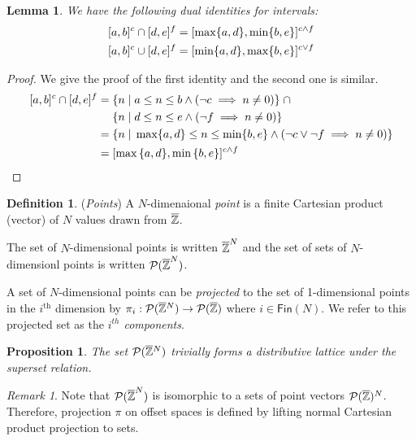 \documentclass[acmlarge,review]{acmart}
\theoremstyle{definition}
\newtheorem{defn}{Definition}
\theoremstyle{plain}
\newtheorem{lem}{Lemma}
\newtheorem{prop}{Proposition}
\theoremstyle{remark}
\newtheorem{remark}{Remark}
\begin{document}
\begin{lem}{}\label{lem:zinf-identities}
  We have the following dual identities for \zinf{} intervals:
%
  \begin{align*}
    \textnormal{$\lbrack a,b\rbrack^{c}$} \cap \textnormal{$\lbrack d,e\rbrack^{f}$} & =
      \textnormal{$\lbrack\max \{a,d\},\min \{b,e\}\rbrack^{c \wedge f}$} \\
    \textnormal{$\lbrack a,b\rbrack^{c}$} \cup \textnormal{$\lbrack d,e\rbrack^{f}$} & =
      \textnormal{$\lbrack\min \{a,d\},\max \{b,e\}\rbrack^{c \vee f}$}
  \end{align*}
\end{lem}
%
\begin{proof}
  We give the proof of the first identity and the second one is similar.
  \begin{align*}
    \textnormal{$\lbrack a,b\rbrack^{c}$} \cap \textnormal{$\lbrack d,e\rbrack^{f}$} = &
      \; \{ n \;|\; a \leq n \leq b \wedge (\neg c \implies n \neq 0) \}
      \;\cap \\
      & \; \{ n \;|\; d \leq n \leq e \wedge (\neg f \implies n \neq 0) \}
      \\
    = & \; \{ n \;|\; \max \{a,d\} \leq n \leq \min \{b,e\} \wedge (\neg c
      \vee \neg f \implies n \neq 0) \} \\
    = & \; \textnormal{$\lbrack\max{\{a,d\}},\min{\{b,e\}}\rbrack^{c \wedge f}$}
  \end{align*}
\end{proof}

\begin{defn}{(\emph{Points})}
  A $N$-dimenaional \emph{point} is a finite Cartesian product
  (vector) of $N$ values drawn from $\textnormal{$\overline{\mathbb{Z}}$}$.

  The set of $N$-dimensional points is written $\textnormal{$\overline{\mathbb{Z}}$}^N$ and the set
  of sets of $N$-dimensionl points is written $\mathcal{P}(\textnormal{$\overline{\mathbb{Z}}$}^N)$.

A set of $N$-dimensional points can be \emph{projected} to the set of
1-dimensional points in the $i^{\text{th}}$ dimension by
$\pi_i : \mathcal{P}(\textnormal{$\overline{\mathbb{Z}}$}{}^{\mkern0mu{N}}) \to
\mathcal{P}(\textnormal{$\overline{\mathbb{Z}}$}{})$
where $i \in \mathsf{Fin}(N)$. We refer to this projected set as the
\emph{$i^{th}$ components}.
\end{defn}

\begin{prop}
The set $\mathcal{P}{(\textnormal{$\overline{\mathbb{Z}}$}{}^{{N}})}$ trivially forms a
  distributive lattice under the superset relation.
\end{prop}

\begin{remark}
Note that $\mathcal{P}(\textnormal{$\overline{\mathbb{Z}}$}^N)$ is isomorphic to a sets of point
vectors $\mathcal{P}(\textnormal{$\overline{\mathbb{Z}}$})^N$. Therefore, projection $\pi$ on 
offset spaces is defined by lifting normal Cartesian product
projection to sets.
\end{remark}
\end{document}
